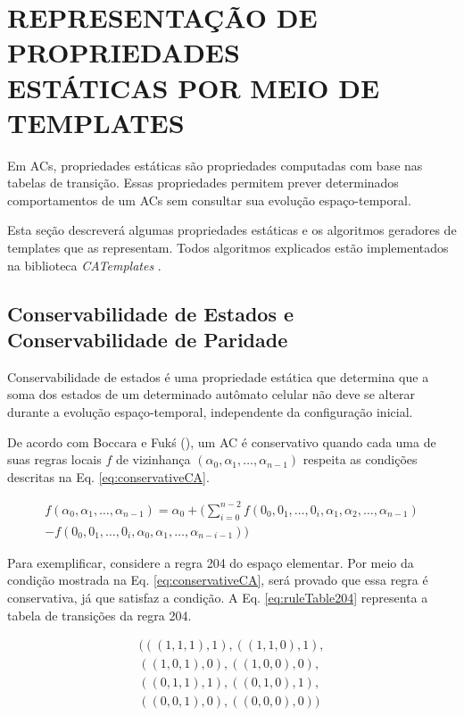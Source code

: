 \section[REPRESENTAÇÃO DE PROPRIEDADES ESTÁTICAS POR MEIO DE TEMPLATES]{REPRESENTAÇÃO DE PROPRIEDADES \\ ESTÁTICAS POR MEIO DE TEMPLATES}
\label{sec:propriedadesEstaticas}

Em ACs, propriedades estáticas são propriedades computadas com base nas tabelas de transição. Essas propriedades permitem prever determinados comportamentos de um ACs sem consultar sua evolução espaço-temporal. 

Esta seção descreverá algumas propriedades estáticas e os algoritmos geradores de templates que as representam. Todos algoritmos explicados estão implementados na biblioteca \textit{CATemplates} \cite{CATemplates}.

\subsection{Conservabilidade de Estados e Conservabilidade de Paridade}
Conservabilidade de estados é uma propriedade estática que determina que a soma dos estados de um determinado autômato celular não deve se alterar durante a evolução espaço-temporal, independente da configuração inicial.

De acordo com Boccara e Fukś (\citeyear{boccara2002}), um AC é conservativo quando cada uma de suas regras locais $f$ de vizinhança $(\alpha_0,\alpha_1, \dots, \alpha_{n-1})$ respeita as condições descritas na Eq. \eqref{eq:conservativeCA}.

\begin{equation}
\begin{split}
f(\alpha_0,\alpha_1, \dots,\alpha_{n-1}) = \alpha_0 + (\sum_{i=0}^{n-2}f(0_0,0_1, \dots,0_i,\alpha_1,\alpha_2, \dots,\alpha_{n-1}) \\- f(0_0,0_1, \dots,0_i,\alpha_0,\alpha_1, \dots,\alpha_{n-i-1}))
\label{eq:conservativeCA}
\end{split}
\end{equation}

Para exemplificar, considere a regra 204 do espaço elementar. Por meio da condição mostrada na Eq. \eqref{eq:conservativeCA}, será provado que essa regra é conservativa, já que satisfaz a condição. A Eq. \eqref{eq:ruleTable204} representa a tabela de transições da regra 204.

\begin{equation}
\begin{split}
(((1,1,1),1),((1,1,0),1),\\((1,0,1),0),((1,0,0),0),\\((0,1,1),1),((0,1,0),1),\\((0,0,1),0),((0,0,0),0))
\label{eq:ruleTable204}
\end{split}
\end{equation}

